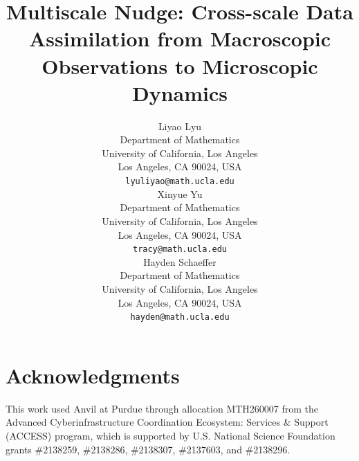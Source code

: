 \documentclass{article}
\title{
Multiscale Nudge: Cross-scale Data Assimilation from Macroscopic Observations to Microscopic Dynamics
}
\author{
  Liyao Lyu\\
  Department of Mathematics \\
  University of California, Los Angeles \\
  Los Angeles, CA 90024, USA\\
  \texttt{lyuliyao@math.ucla.edu} \\
  \AND
   Xinyue Yu \\
  Department of Mathematics \\
  University of California, Los Angeles \\
  Los Angeles, CA 90024, USA\\
  \texttt{tracy@math.ucla.edu} \\
  \AND
   Hayden Schaeffer  \\
  Department of Mathematics \\
  University of California, Los Angeles \\
  Los Angeles, CA 90024, USA\\
  \texttt{hayden@math.ucla.edu} \\
}
\theoremstyle{definition}
\begin{document}
\maketitle








\section*{Acknowledgments}
 This work used Anvil at Purdue through allocation MTH260007 from the Advanced Cyberinfrastructure Coordination Ecosystem: Services \& Support (ACCESS) program\cite{boerner2023access}, which is supported by U.S. National Science Foundation grants \#2138259, \#2138286, \#2138307, \#2137603, and \#2138296.
  
  

\appendix

\end{document}
